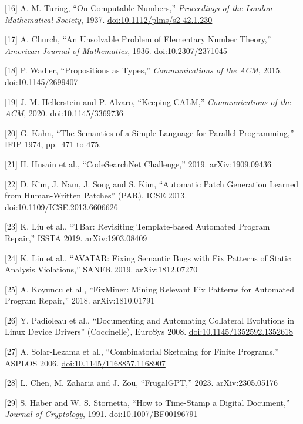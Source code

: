 \documentclass[10pt,letterpaper]{article}
\begin{document}
{[}16{]} A. M. Turing, ``On Computable Numbers,'' \emph{Proceedings of
the London Mathematical Society}, 1937.
\href{https://doi.org/10.1112/plms/s2-42.1.230}{doi:10.1112/plms/s2-42.1.230}

{[}17{]} A. Church, ``An Unsolvable Problem of Elementary Number
Theory,'' \emph{American Journal of Mathematics}, 1936.
\href{https://doi.org/10.2307/2371045}{doi:10.2307/2371045}

{[}18{]} P. Wadler, ``Propositions as Types,'' \emph{Communications of
the ACM}, 2015.
\href{https://doi.org/10.1145/2699407}{doi:10.1145/2699407}

{[}19{]} J. M. Hellerstein and P. Alvaro, ``Keeping CALM,''
\emph{Communications of the ACM}, 2020.
\href{https://doi.org/10.1145/3369736}{doi:10.1145/3369736}

{[}20{]} G. Kahn, ``The Semantics of a Simple Language for Parallel
Programming,'' IFIP 1974, pp.~471 to 475.

{[}21{]} H. Husain et al., ``CodeSearchNet Challenge,'' 2019.
arXiv:1909.09436

{[}22{]} D. Kim, J. Nam, J. Song and S. Kim, ``Automatic Patch
Generation Learned from Human-Written Patches'' (PAR), ICSE 2013.
\href{https://doi.org/10.1109/ICSE.2013.6606626}{doi:10.1109/ICSE.2013.6606626}

{[}23{]} K. Liu et al., ``TBar: Revisiting Template-based Automated
Program Repair,'' ISSTA 2019. arXiv:1903.08409

{[}24{]} K. Liu et al., ``AVATAR: Fixing Semantic Bugs with Fix Patterns
of Static Analysis Violations,'' SANER 2019. arXiv:1812.07270

{[}25{]} A. Koyuncu et al., ``FixMiner: Mining Relevant Fix Patterns for
Automated Program Repair,'' 2018. arXiv:1810.01791

{[}26{]} Y. Padioleau et al., ``Documenting and Automating Collateral
Evolutions in Linux Device Drivers'' (Coccinelle), EuroSys 2008.
\href{https://doi.org/10.1145/1352592.1352618}{doi:10.1145/1352592.1352618}

{[}27{]} A. Solar-Lezama et al., ``Combinatorial Sketching for Finite
Programs,'' ASPLOS 2006.
\href{https://doi.org/10.1145/1168857.1168907}{doi:10.1145/1168857.1168907}

{[}28{]} L. Chen, M. Zaharia and J. Zou, ``FrugalGPT,'' 2023.
arXiv:2305.05176

{[}29{]} S. Haber and W. S. Stornetta, ``How to Time-Stamp a Digital
Document,'' \emph{Journal of Cryptology}, 1991.
\href{https://doi.org/10.1007/BF00196791}{doi:10.1007/BF00196791}
\end{document}
